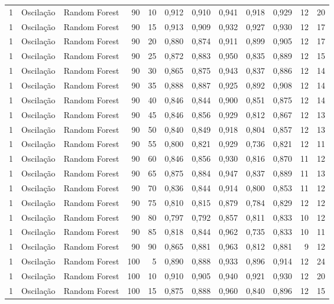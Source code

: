\begin{longtable}{@{}rllrrrrrrrrr@{}}
1 & Oscilação & Random Forest & 90 & 10 & 0,912 & 0,910 & 0,941 & 0,918 & 0,929 & 12 & 20 \\
1 & Oscilação & Random Forest & 90 & 15 & 0,913 & 0,909 & 0,932 & 0,927 & 0,930 & 12 & 17 \\
1 & Oscilação & Random Forest & 90 & 20 & 0,880 & 0,874 & 0,911 & 0,899 & 0,905 & 12 & 17 \\
1 & Oscilação & Random Forest & 90 & 25 & 0,872 & 0,883 & 0,950 & 0,835 & 0,889 & 12 & 15 \\
1 & Oscilação & Random Forest & 90 & 30 & 0,865 & 0,875 & 0,943 & 0,837 & 0,886 & 12 & 14 \\
1 & Oscilação & Random Forest & 90 & 35 & 0,888 & 0,887 & 0,925 & 0,892 & 0,908 & 12 & 14 \\
1 & Oscilação & Random Forest & 90 & 40 & 0,846 & 0,844 & 0,900 & 0,851 & 0,875 & 12 & 14 \\
1 & Oscilação & Random Forest & 90 & 45 & 0,846 & 0,856 & 0,929 & 0,812 & 0,867 & 12 & 13 \\
1 & Oscilação & Random Forest & 90 & 50 & 0,840 & 0,849 & 0,918 & 0,804 & 0,857 & 12 & 13 \\
1 & Oscilação & Random Forest & 90 & 55 & 0,800 & 0,821 & 0,929 & 0,736 & 0,821 & 12 & 11 \\
1 & Oscilação & Random Forest & 90 & 60 & 0,846 & 0,856 & 0,930 & 0,816 & 0,870 & 11 & 12 \\
1 & Oscilação & Random Forest & 90 & 65 & 0,875 & 0,884 & 0,947 & 0,837 & 0,889 & 11 & 13 \\
1 & Oscilação & Random Forest & 90 & 70 & 0,836 & 0,844 & 0,914 & 0,800 & 0,853 & 11 & 12 \\
1 & Oscilação & Random Forest & 90 & 75 & 0,810 & 0,815 & 0,879 & 0,784 & 0,829 & 12 & 12 \\
1 & Oscilação & Random Forest & 90 & 80 & 0,797 & 0,792 & 0,857 & 0,811 & 0,833 & 10 & 12 \\
1 & Oscilação & Random Forest & 90 & 85 & 0,818 & 0,844 & 0,962 & 0,735 & 0,833 & 10 & 11 \\
1 & Oscilação & Random Forest & 90 & 90 & 0,865 & 0,881 & 0,963 & 0,812 & 0,881 & 9 & 12 \\
1 & Oscilação & Random Forest & 100 & 5 & 0,890 & 0,888 & 0,933 & 0,896 & 0,914 & 12 & 24 \\
1 & Oscilação & Random Forest & 100 & 10 & 0,910 & 0,905 & 0,940 & 0,921 & 0,930 & 12 & 20 \\
1 & Oscilação & Random Forest & 100 & 15 & 0,875 & 0,888 & 0,960 & 0,840 & 0,896 & 12 & 15 \\

\end{longtable}

